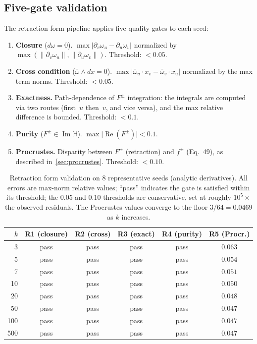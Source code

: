 \documentclass[11pt,a4paper]{article}
\theoremstyle{plain}
\theoremstyle{definition}
\theoremstyle{remark}
\DeclareMathOperator{\Real}{Re}
\DeclareMathOperator{\Imag}{Im}
\newcommand{\HH}{\mathbb{H}}            %
\newcommand{\abs}[1]{\lvert #1 \rvert}
\newcommand{\norm}[1]{\lVert #1 \rVert}
\begin{document}
\subsection{Five-gate validation}\label{sec:fivegate}
The retraction form pipeline applies five quality gates to each seed:
\begin{enumerate}[nosep,label=\textbf{R\arabic*.}]
\item \textbf{Closure} ($d\omega = 0$).
  $\max\abs{\partial_v \omega_u - \partial_u \omega_v}$ normalized
  by $\max(\norm{\partial_v\omega_u}, \norm{\partial_u\omega_v})$.
  Threshold: $< 0.05$.
\item \textbf{Cross condition} ($\bar\omega \wedge dx = 0$).
  $\max\abs{\bar\omega_u \cdot x_v - \bar\omega_v \cdot x_u}$
  normalized by the max term norms.
  Threshold: $< 0.05$.
\item \textbf{Exactness.}
  Path-dependence of $F^\pm$ integration: the integrals are
  computed via two routes (first~$u$ then~$v$, and vice versa),
  and the max relative difference is bounded.
  Threshold: $< 0.1$.
\item \textbf{Purity} ($F^\pm \in \Imag\HH$).
  $\max\abs{\Real(F^\pm)} < 0.1$.
\item \textbf{Procrustes.}
  Disparity between $F^\pm$ (retraction) and $f^\pm$ (Eq.~49),
  as described in~\cref{sec:procrustes}.
  Threshold: $< 0.10$.
\end{enumerate}

\begin{table}[ht]
\centering
\caption{Retraction form validation on $8$ representative seeds (analytic
  derivatives).  All errors are max-norm relative values;
  ``pass'' indicates the gate is satisfied within its threshold;
  the $0.05$ and $0.10$ thresholds are conservative,
  set at roughly $10^5\times$ the observed residuals.
  The Procrustes values converge to the floor
  $3/64 = 0.0469$ as $k$ increases.}
\label{tab:retraction}
\smallskip
\begin{tabular}{@{}rccccc@{}}
\toprule
$k$ & R1 (closure) & R2 (cross) & R3 (exact) & R4 (purity) & R5 (Procr.) \\
\midrule
3   & pass & pass & pass & pass & $0.063$ \\
5   & pass & pass & pass & pass & $0.054$ \\
7   & pass & pass & pass & pass & $0.051$ \\
10  & pass & pass & pass & pass & $0.050$ \\
20  & pass & pass & pass & pass & $0.048$ \\
50  & pass & pass & pass & pass & $0.047$ \\
100 & pass & pass & pass & pass & $0.047$ \\
500 & pass & pass & pass & pass & $0.047$ \\
\bottomrule
\end{tabular}
\end{table}
\end{document}
